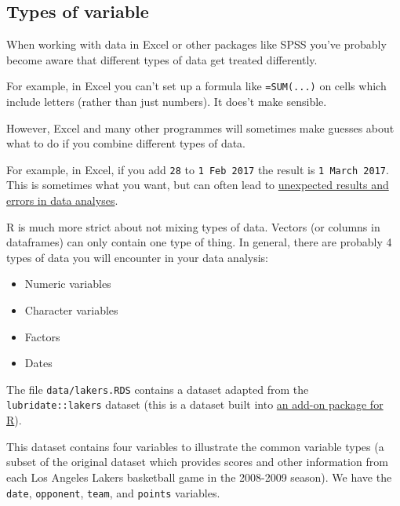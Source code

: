 \documentclass[]{article}
\providecommand{\tightlist}{%
  \setlength{\itemsep}{0pt}\setlength{\parskip}{0pt}}
\theoremstyle{definition}
\theoremstyle{definition}
\theoremstyle{definition}
\theoremstyle{remark}
\begin{document}
\hypertarget{factors-and-numerics}{\subsection*{Types of
variable}\label{factors-and-numerics}}

When working with data in Excel or other packages like SPSS you've
probably become aware that different types of data get treated
differently.

For example, in Excel you can't set up a formula like \texttt{=SUM(...)}
on cells which include letters (rather than just numbers). It does't
make sensible.

However, Excel and many other programmes will sometimes make guesses
about what to do if you combine different types of data.

For example, in Excel, if you add \texttt{28} to \texttt{1\ Feb\ 2017}
the result is \texttt{1\ March\ 2017}. This is sometimes what you want,
but can often lead to
\href{http://www.sciencemag.org/news/sifter/one-five-genetics-papers-contains-errors-thanks-microsoft-excel}{unexpected
results and errors in data analyses}.

R is much more strict about not mixing types of data. Vectors (or
columns in dataframes) can only contain one type of thing. In general,
there are probably 4 types of data you will encounter in your data
analysis:

\begin{itemize}
\tightlist
\item
  Numeric variables
\item
  Character variables
\item
  Factors
\item
  Dates
\end{itemize}

The file \texttt{data/lakers.RDS} contains a dataset adapted from the
\texttt{lubridate::lakers} dataset (this is a dataset built into
\protect\hyperlink{packages}{an add-on package for R}).

This dataset contains four variables to illustrate the common variable
types (a subset of the original dataset which provides scores and other
information from each Los Angeles Lakers basketball game in the
2008-2009 season). We have the \texttt{date}, \texttt{opponent},
\texttt{team}, and \texttt{points} variables.
\end{document}
